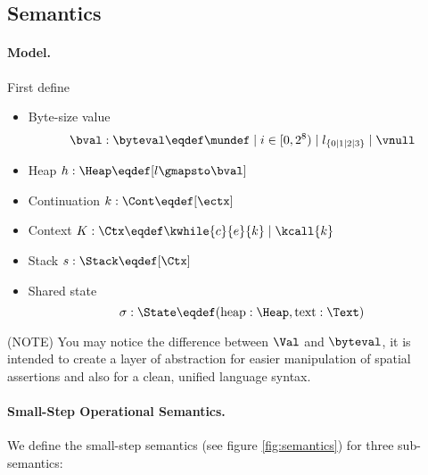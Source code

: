 \subsection{Semantics}\label{sec:semantics}
\paragraph{Model.}

First define
\begin{itemize}
\item Byte-size value \[\bval : \byteval \eqdef \mundef \mid i \in [0, 2^8) \mid l_{\{0 \mid 1 \mid 2 \mid 3\}} \mid \vnull\]
\item Heap $h: \Heap \eqdef [ l \gmapsto \bval ]$
\item Continuation $k: \Cont \eqdef [\ectx]$
\item Context $K: \Ctx \eqdef \kwhile{c}{e}{k} \mid \kcall{k} $
\item Stack $s: \Stack \eqdef [\Ctx]$
\item Shared state \[\sigma: \State \eqdef (\text{heap}: \Heap, \text{text}: \Text)\]
\end{itemize}

(NOTE) You may notice the difference between $\Val$ and $\byteval$, it is intended to create a layer of abstraction for
easier manipulation of spatial assertions and also for a clean, unified language syntax.

\paragraph{Small-Step Operational Semantics.}

We define the small-step semantics (see figure \ref{fig:semantics}) for three sub-semantics:

